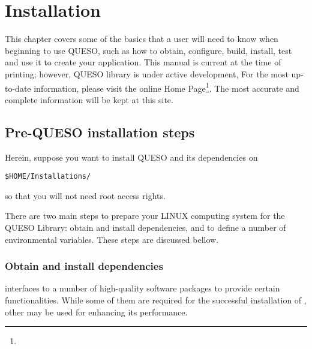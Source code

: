\chapter{Installation}\label{ch-install}
\thispagestyle{headings}


  
This chapter covers some of the basics that a user will need to know when beginning to use QUESO, such as 
how to obtain, configure, build, install, test \Queso{} and use it to create your application.  This manual is current at the time of
printing; however, QUESO library  is under active development, For the most up-to-date information,
please visit the online \Queso{} Home Page\footnote{\Quesoweb}. The most accurate and complete information will be kept at this site.



        
\section{Pre-QUESO installation steps}\label{sec:Pre_Queso}


Herein, suppose you want to install QUESO and its dependencies on 
\begin{center}
\texttt{\$HOME/Installations/} 
\end{center}
%
so that you will not need root access rights. 

There are two main steps to prepare your LINUX computing system  for  the QUESO Library: obtain and install \Queso{} dependencies, and to define a number of environmental variables. These steps are discussed bellow.


\subsection{Obtain and install \Queso{} dependencies}

\Queso{} interfaces to a number of high-quality software packages to provide certain functionalities. While some of them are required for the successful installation of \Queso{}, other may be used for enhancing its performance. 

